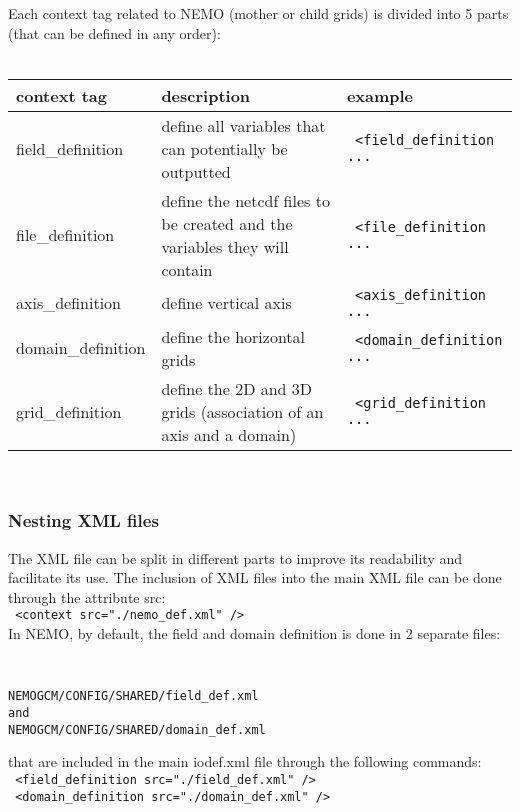 \documentclass[NEMO_book]{subfiles}
\begin{document}
\noindent Each context tag related to NEMO (mother or child grids) is divided into 5 parts (that can be defined in any order):\\
\\
\begin{tabular}{|p{3.0cm}|p{4.5cm}|p{4.5cm}|}
   \hline
   context tag &
   description &
   example \\
   \hline
   \hline
   field\_definition &
   define all variables that can potentially be outputted &
   {\scriptsize \verb? <field_definition ... ?} \\
   \hline
   file\_definition &
   define the netcdf files to be created and the variables they will contain &
   {\scriptsize \verb? <file_definition ... ?} \\
   \hline
   axis\_definition &
   define vertical axis &
   {\scriptsize \verb? <axis_definition ... ?} \\
   \hline
   domain\_definition &
   define the horizontal grids &
   {\scriptsize \verb? <domain_definition ... ?} \\
   \hline
   grid\_definition &
   define the 2D and 3D grids (association of an axis and a domain) &
   {\scriptsize \verb? <grid_definition ... ?} \\
   \hline
\end{tabular}
\\

\subsubsection{Nesting XML files}

The XML file can be split in different parts to improve its readability and facilitate its use. The inclusion of XML files into the main XML file can be done through the attribute src: \\
{\scriptsize \verb? <context src="./nemo_def.xml" /> ?}\\
 
\noindent In NEMO, by default, the field and domain definition is done in 2 separate files:
{\scriptsize \tt
\begin{verbatim}
NEMOGCM/CONFIG/SHARED/field_def.xml
and
NEMOGCM/CONFIG/SHARED/domain_def.xml 
\end{verbatim}
}
\noindent that are included in the main iodef.xml file through the following commands: \\
{\scriptsize \verb? <field_definition src="./field_def.xml" /> ? \\
\verb? <domain_definition src="./domain_def.xml" /> ? }
\end{document}
